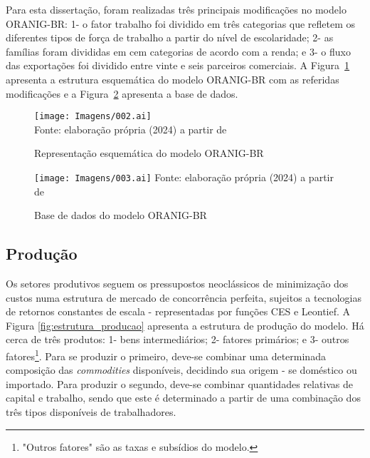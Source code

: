 Para esta dissertação, foram realizadas três principais modificações no modelo ORANIG-BR: 1- o fator trabalho foi dividido em três categorias que refletem os diferentes tipos de força de trabalho a partir do nível de escolaridade; 2- as famílias foram divididas em cem categorias de acordo com a renda; e 3- o fluxo das exportações foi dividido entre vinte e seis parceiros comerciais. A Figura~\ref{fig:estrutura_orani} apresenta a estrutura esquemática do modelo ORANIG-BR com as referidas modificações e a Figura~\ref{fig:dados_orani} apresenta a base de dados.


\begin{landscape}
	\begin{figure}
		\centering
		\caption{Representação esquemática do modelo ORANIG-BR} \label{fig:estrutura_orani}
		\texttt{[image: Imagens/002.ai]}
		\footnotesize \\
		Fonte: elaboração própria (2024) a partir de \textcite{souza15}
	\end{figure}
\end{landscape}

\begin{figure}[H]
	\centering
	\caption{Base de dados do modelo ORANIG-BR} \label{fig:dados_orani}
	\texttt{[image: Imagens/003.ai]}
	\footnotesize
	Fonte: elaboração própria (2024) a partir de \textcite{horridge00}
\end{figure}


\subsection{Produção} \label{subsec:producao}

Os setores produtivos seguem os pressupostos neoclássicos de minimização dos custos numa estrutura de mercado de concorrência perfeita, sujeitos a tecnologias de retornos constantes de escala - representadas por funções CES e Leontief. A Figura \ref{fig:estrutura_producao} apresenta a estrutura de produção do modelo. Há cerca de três produtos: 1- bens intermediários; 2- fatores primários; e 3- outros fatores\footnote{"Outros fatores" são as taxas e subsídios do modelo.}. Para se produzir o primeiro, deve-se combinar uma determinada composição das \textit{commodities} disponíveis, decidindo sua origem - se doméstico ou importado. Para produzir o segundo, deve-se combinar quantidades relativas de capital e trabalho, sendo que este é determinado a partir de uma combinação dos três tipos disponíveis de trabalhadores.

